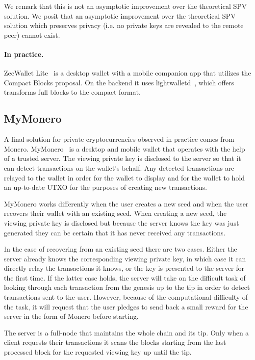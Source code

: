 We remark that this is not an asymptotic improvement over the theoretical SPV solution. We posit that an asymptotic improvement over the theoretical SPV solution which preserves privacy (i.e. no private keys are revealed to the remote peer) cannot exist.

\paragraph{In practice.}
ZecWallet Lite~\cite{zecwallet} is a desktop wallet with a mobile companion app that utilizes the Compact Blocks proposal. On the backend it uses lightwalletd~\cite{lightwalletd}, which offers transforms full blocks to the compact format.

\subsection{MyMonero}
\label{mymonero}
A final solution for private cryptocurrencies observed in practice comes from Monero. MyMonero~\cite{mymonero} is a desktop and mobile wallet that operates with the help of a trusted server. The viewing private key is disclosed to the server so that it can detect transactions on the wallet's behalf. Any detected transactions are relayed to the wallet in order for the wallet to display and for the wallet to hold an up-to-date UTXO for the purposes of creating new transactions.

MyMonero works differently when the user creates a new seed and when the user recovers their wallet with an existing seed. When creating a new seed, the viewing private key is disclosed but because the server knows the key was just generated they can be certain that it has never received any transactions.

In the case of recovering from an existing seed there are two cases. Either the server already knows the corresponding viewing private key, in which case it can directly relay the transactions it knows, or the key is presented to the server for the first time. If the latter case holds, the server will take on the difficult task of looking through each transaction from the genesis up to the tip in order to detect transactions sent to the user. However, because of the computational difficulty of the task, it will request that the user pledges to send back a small reward for the server in the form of Monero before starting.

The server is a full-node that maintains the whole chain and its tip. Only when a client requests their transactions it scans the blocks starting from the last processed block for the requested viewing key up until the tip.
